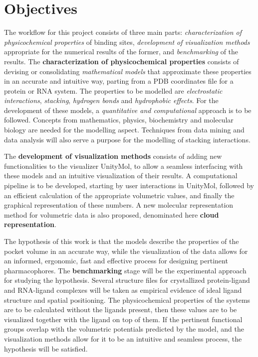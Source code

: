 \chapter{Objectives} %

The workflow for this project consists of three main parts: \textit{characterization of physicochemical properties} of binding sites, \textit{development of visualization methods} appropriate for the numerical results of the former, and \textit{benchmarking} of the results. The \textbf{characterization of physicochemical properties} consists of devising or consolidating \textit{mathematical models} that approximate these properties in an accurate and intuitive way, parting from a PDB coordinates file for a protein or RNA system. The properties to be modelled are \textit{electrostatic interactions}, \textit{stacking}, \textit{hydrogen bonds} and \textit{hydrophobic effects}. For the development of these models, a \textit{quantitative and computational} approach is to be followed. Concepts from mathematics, physics, biochemistry and molecular biology are needed for the modelling aspect. Techniques from data mining and data analysis will also serve a purpose for the modelling of stacking interactions.

The \textbf{development of visualization methods} consists of adding new functionalities to the visualizer UnityMol, to allow a seamless interfacing with these models and an intuitive visualization of their results. A computational pipeline is to be developed, starting by user interactions in UnityMol, followed by an efficient calculation of the appropriate volumetric values, and finally the graphical representation of these numbers. A new molecular representation method for volumetric data is also proposed, denominated here \textbf{cloud representation}.

The hypothesis of this work is that the models describe the properties of the pocket volume in an accurate way, while the visualization of the data allows for an informed, ergonomic, fast and effective process for designing pertinent pharmacophores. The \textbf{benchmarking} stage will be the experimental approach for studying the hypothesis. Several structure files for crystallized protein-ligand and RNA-ligand complexes will be taken as empirical evidence of ideal ligand structure and spatial positioning. The physicochemical properties of the systems are to be calculated without the ligands present, then these values are to be visualized together with the ligand on top of them. If the pertinent functional groups overlap with the volumetric potentials predicted by the model, and the visualization methods allow for it to be an intuitive and seamless process, the hypothesis will be satisfied.
